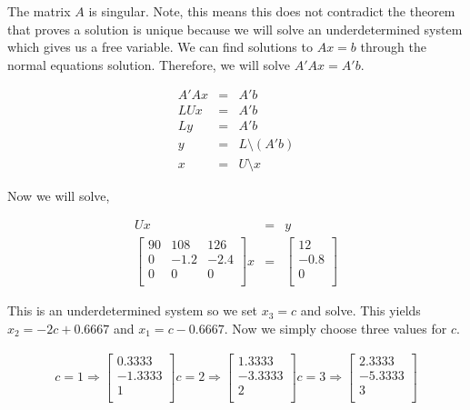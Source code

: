 The matrix \(A\) is singular.
Note, this means this does not contradict the theorem that proves a solution is unique because we will solve an underdetermined system which gives us a free variable.
We can find solutions to \(Ax=b\) through the normal equations solution.
Therefore, we will solve \(A'Ax=A'b\).

\begin{eqnarray}
  A'Ax &=& A'b \\
  LUx &=& A'b \\
  Ly &=& A'b \\
  y &=& L \setminus (A'b) \\
  x &=& U \setminus x
\end{eqnarray}



Now we will solve,

\begin{eqnarray}
  Ux &=& y \\
  \begin{bmatrix}
    90 & 108 & 126 \\
    0 & -1.2 & -2.4 \\
    0 & 0 & 0 \\
  \end{bmatrix}
  x &=&
  \begin{bmatrix}
    12 \\
    -0.8 \\
    0 \\
  \end{bmatrix}
\end{eqnarray}

This is an underdetermined system so we set \(x_3 = c\) and solve.
This yields \(x_2 = -2c + 0.6667\) and \(x_1 = c - 0.6667\).
Now we simply choose three values for \(c\).

\begin{eqnarray}
  c = 1 \Rightarrow
  \begin{bmatrix}
     0.3333 \\
    -1.3333 \\
    1 \\
  \end{bmatrix}
  c = 2 \Rightarrow
  \begin{bmatrix}
    1.3333 \\
    -3.3333 \\
    2 \\
  \end{bmatrix}
  c = 3 \Rightarrow
  \begin{bmatrix}
    2.3333 \\
    -5.3333 \\
    3 \\
  \end{bmatrix}
\end{eqnarray}
